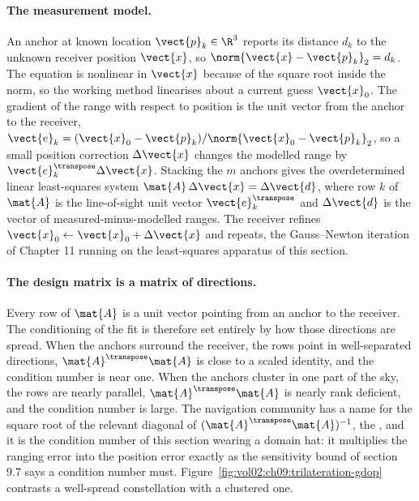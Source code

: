 \paragraph{The measurement model.}
An anchor at known location $\vect{p}_{k} \in \R^{3}$ reports its
distance $d_{k}$ to the unknown receiver position $\vect{x}$, so
$\norm{\vect{x} - \vect{p}_{k}}_{2} = d_{k}$. The equation is nonlinear
in $\vect{x}$ because of the square root inside the norm, so the working
method linearises about a current guess $\vect{x}_{0}$. The gradient of
the range with respect to position is the unit vector from the anchor to
the receiver, $\vect{e}_{k} = (\vect{x}_{0} - \vect{p}_{k})/
\norm{\vect{x}_{0} - \vect{p}_{k}}_{2}$, so a small position correction
$\Delta\vect{x}$ changes the modelled range by $\vect{e}_{k}^{\transpose}
\Delta\vect{x}$. Stacking the $m$ anchors gives the overdetermined
linear least-squares system $\mat{A}\,\Delta\vect{x} = \Delta\vect{d}$,
where row $k$ of $\mat{A}$ is the line-of-sight unit vector
$\vect{e}_{k}^{\transpose}$ and $\Delta\vect{d}$ is the vector of
measured-minus-modelled ranges. The receiver refines $\vect{x}_{0}
\leftarrow \vect{x}_{0} + \Delta\vect{x}$ and repeats, the Gauss--Newton
iteration of Chapter 11 running on the least-squares apparatus of this
section.

\paragraph{The design matrix is a matrix of directions.}
Every row of $\mat{A}$ is a unit vector pointing from an anchor to the
receiver. The conditioning of the fit is therefore set entirely by how
those directions are spread. When the anchors surround the receiver,
the rows point in well-separated directions, $\mat{A}^{\transpose}
\mat{A}$ is close to a scaled identity, and the condition number is near
one. When the anchors cluster in one part of the sky, the rows are
nearly parallel, $\mat{A}^{\transpose}\mat{A}$ is nearly rank
deficient, and the condition number is large. The navigation community
has a name for the square root of the relevant diagonal of
$(\mat{A}^{\transpose}\mat{A})^{-1}$, the , and it is the condition number of this section wearing a
domain hat: it multiplies the ranging error into the position error
exactly as the sensitivity bound of section 9.7 says a condition number
must. Figure~\ref{fig:vol02:ch09:trilateration-gdop} contrasts a
well-spread constellation with a clustered one.

